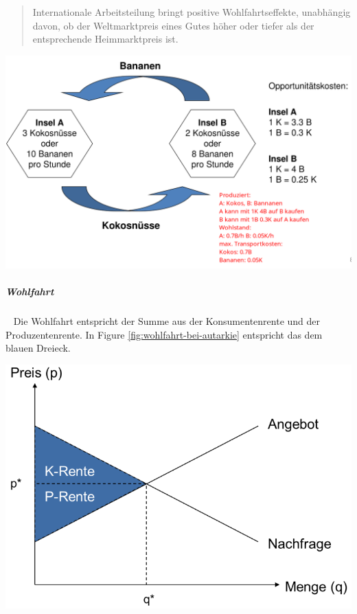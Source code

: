 \documentclass[11pt,twoside,landscape]{article}
\begin{document}
\begin{multicols}{3}
\begin{quote}
Internationale Arbeitsteilung bringt positive Wohlfahrtseffekte, unabhängig
davon, ob der Weltmarktpreis eines Gutes höher oder tiefer als der
entsprechende Heimmarktpreis ist.
\end{quote}

{
\begin{center}
\includegraphics[width=.9\linewidth]{img/komparativen_kostenvorteils.png}
\end{center}
\label{fig:komparativen-kostenvorteil}
}

\subparagraph{Wohlfahrt} \
\label{sec:org6bc1954}
Die Wohlfahrt entspricht der Summe aus der Konsumentenrente und der Produzentenrente.
In Figure \ref{fig:wohlfahrt-bei-autarkie} entspricht das dem blauen Dreieck.

{
\begin{center}
\includegraphics[width=.9\linewidth]{img/wohlfahrt_bei_autarkie.png}
\end{center}
\label{fig:wohlfahrt-bei-autarkie}
}


\end{multicols}
\end{document}
